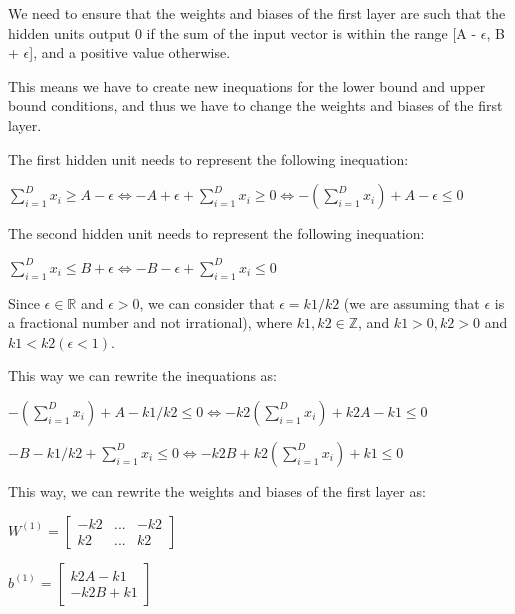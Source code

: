 \documentclass{article}
\begin{document}
We need to ensure that the weights and biases of the first layer are such that the hidden units output 0 if the sum of the input vector is 
within the range [A - $\epsilon$, B + $\epsilon$], and a positive value otherwise.

This means we have to create new inequations for the lower bound and upper bound conditions, 
and thus we have to change the weights and biases of the first layer.

\bigskip

The first hidden unit needs to represent the following inequation:

\bigskip

$ \sum_{i=1}^{D} x_i \geq A - \epsilon \iff -A + \epsilon + \sum_{i=1}^{D} x_i \geq 0 
\iff -(\sum_{i=1}^{D} x_i) + A - \epsilon \leq 0$

\bigskip

The second hidden unit needs to represent the following inequation:

\bigskip

$ \sum_{i=1}^{D} x_i \leq B + \epsilon \iff -B - \epsilon + \sum_{i=1}^{D} x_i \leq 0$

\bigskip

Since $\epsilon \in \mathbb{R}$ and $\epsilon > 0$, we can consider that $\epsilon = k1/k2$ (we are assuming that $\epsilon$
is a fractional number and not irrational), where $k1, k2 \in \mathbb{Z}$, and $k1 > 0, k2 > 0$ and $k1 < k2 (\epsilon < 1)$.

\bigskip

This way we can rewrite the inequations as:

\bigskip

$ -(\sum_{i=1}^{D} x_i) + A - k1/k2 \leq 0 \iff -k2(\sum_{i=1}^{D} x_i) + k2A - k1 \leq 0$

\bigskip

$ -B - k1/k2 + \sum_{i=1}^{D} x_i \leq 0 \iff -k2B + k2(\sum_{i=1}^{D} x_i) + k1 \leq 0$

\bigskip

This way, we can rewrite the weights and biases of the first layer as:

\bigskip

\( W^{(1)} = \begin{bmatrix}
    -k2 & ...  & -k2\\
    k2 & ... & k2
\end{bmatrix}
\)

\bigskip

\(b^{(1)} = \begin{bmatrix}
    k2A - k1 \\
    -k2B + k1
\end{bmatrix}
\)
\end{document}
